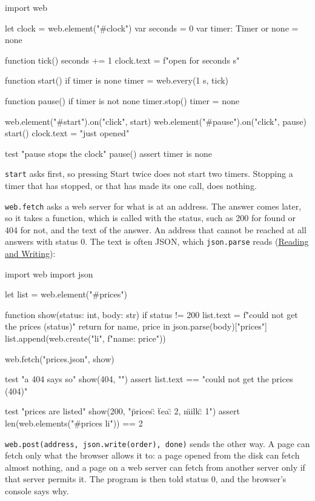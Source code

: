 \begin{zeno}[file=clock.zeno, dir=clock, cmd=zeno test {file}]
import web

let clock = web.element("#clock")
var seconds = 0
var timer: Timer or none = none

function tick() {
    seconds += 1
    clock.text = f"open for {seconds} s"
}

function start() {
    if timer is none {
        timer = web.every(1 s, tick)
    }
}

function pause() {
    if timer is not none {
        timer.stop()
        timer = none
    }
}

web.element("#start").on("click", start)
web.element("#pause").on("click", pause)
start()
clock.text = "just opened"

test "pause stops the clock" {
    pause()
    assert timer is none
}
\end{zeno}

\verb|start| asks first, so pressing Start twice does not start two
timers. Stopping a timer that has stopped, or that has made its one
call, does nothing.

\verb|web.fetch| asks a web server for what is at an address. The
answer comes later, so it takes a function, which is called with the
status, such as 200 for found or 404 for not, and the text of the
answer. An address that cannot be reached at all answers with status
0. The text is often JSON, which \verb|json.parse| reads
(\hyperref[ch-reading-writing]{Reading and Writing}):

\begin{zeno}[file=prices.zeno, dir=prices, cmd=zeno test {file}]
import web
import json

let list = web.element("#prices")

function show(status: int, body: str) {
    if status != 200 {
        list.text = f"could not get the prices ({status})"
        return
    }
    for name, price in json.parse(body)["prices"] {
        list.append(web.create("li", f"{name}: {price}"))
    }
}

web.fetch("prices.json", show)

test "a 404 says so" {
    show(404, "")
    assert list.text == "could not get the prices (404)"
}

test "prices are listed" {
    show(200, "{\"prices\": {\"tea\": 2, \"milk\": 1}}")
    assert len(web.elements("#prices li")) == 2
}
\end{zeno}

\verb|web.post(address, json.write(order), done)| sends the other way.
A page can fetch only what the browser allows it to: a page opened from
the disk can fetch almost nothing, and a page on a web server can fetch
from another server only if that server permits it. The program is
then told status 0, and the browser's console says why.


